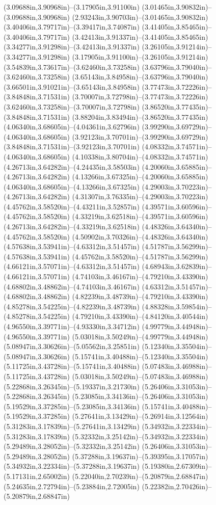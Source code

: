 (3.09688in,3.90968in)--(3.17905in,3.91100in) (3.01465in,3.90832in)--(3.09688in,3.90968in) (2.93243in,3.90703in)--(3.01465in,3.90832in) (3.40406in,3.79717in)--(3.39417in,3.74087in) (3.41405in,3.85465in)--(3.40406in,3.79717in) (3.42413in,3.91337in)--(3.41405in,3.85465in) (3.34277in,3.91298in)--(3.42413in,3.91337in) (3.26105in,3.91214in)--(3.34277in,3.91298in) (3.17905in,3.91100in)--(3.26105in,3.91214in) (3.54839in,3.73617in)--(3.62460in,3.73258in) (3.63796in,3.79040in)--(3.62460in,3.73258in) (3.65143in,3.84958in)--(3.63796in,3.79040in) (3.66501in,3.91021in)--(3.65143in,3.84958in) (3.77473in,3.72226in)--(3.84848in,3.71531in) (3.70007in,3.72798in)--(3.77473in,3.72226in) (3.62460in,3.73258in)--(3.70007in,3.72798in) (3.86520in,3.77435in)--(3.84848in,3.71531in) (3.88204in,3.83494in)--(3.86520in,3.77435in) (4.06340in,3.68605in)--(4.04361in,3.62796in) (3.99290in,3.69729in)--(4.06340in,3.68605in) (3.92123in,3.70701in)--(3.99290in,3.69729in) (3.84848in,3.71531in)--(3.92123in,3.70701in) (4.08332in,3.74571in)--(4.06340in,3.68605in) (4.10338in,3.80704in)--(4.08332in,3.74571in) (4.26713in,3.64282in)--(4.24435in,3.58503in) (4.20060in,3.65885in)--(4.26713in,3.64282in) (4.13266in,3.67325in)--(4.20060in,3.65885in) (4.06340in,3.68605in)--(4.13266in,3.67325in) (4.29003in,3.70223in)--(4.26713in,3.64282in) (4.31307in,3.76335in)--(4.29003in,3.70223in) (4.45762in,3.58520in)--(4.43211in,3.52857in) (4.39571in,3.60596in)--(4.45762in,3.58520in) (4.33219in,3.62518in)--(4.39571in,3.60596in) (4.26713in,3.64282in)--(4.33219in,3.62518in) (4.48326in,3.64340in)--(4.45762in,3.58520in) (4.50902in,3.70326in)--(4.48326in,3.64340in) (4.57638in,3.53941in)--(4.63312in,3.51457in) (4.51787in,3.56299in)--(4.57638in,3.53941in) (4.45762in,3.58520in)--(4.51787in,3.56299in) (4.66121in,3.57071in)--(4.63312in,3.51457in) (4.68943in,3.62839in)--(4.66121in,3.57071in) (4.74103in,3.46167in)--(4.79210in,3.43390in) (4.68802in,3.48862in)--(4.74103in,3.46167in) (4.63312in,3.51457in)--(4.68802in,3.48862in) (4.82239in,3.48739in)--(4.79210in,3.43390in) (4.85278in,3.54225in)--(4.82239in,3.48739in) (4.88328in,3.59854in)--(4.85278in,3.54225in) (4.79210in,3.43390in)--(4.84120in,3.40544in) (4.96550in,3.39771in)--(4.93330in,3.34712in) (4.99779in,3.44948in)--(4.96550in,3.39771in) (5.03018in,3.50249in)--(4.99779in,3.44948in) (5.08947in,3.30626in)--(5.05562in,3.25851in) (5.12340in,3.35504in)--(5.08947in,3.30626in) (5.15741in,3.40488in)--(5.12340in,3.35504in) (5.11725in,3.43728in)--(5.15741in,3.40488in) (5.07483in,3.46988in)--(5.11725in,3.43728in) (5.03018in,3.50249in)--(5.07483in,3.46988in) (5.22868in,3.26345in)--(5.19337in,3.21730in) (5.26406in,3.31053in)--(5.22868in,3.26345in) (5.23085in,3.34136in)--(5.26406in,3.31053in) (5.19529in,3.37285in)--(5.23085in,3.34136in) (5.15741in,3.40488in)--(5.19529in,3.37285in) (5.27641in,3.13429in)--(5.26914in,3.12564in) (5.31283in,3.17839in)--(5.27641in,3.13429in) (5.34932in,3.22334in)--(5.31283in,3.17839in) (5.32332in,3.25142in)--(5.34932in,3.22334in) (5.29489in,3.28052in)--(5.32332in,3.25142in) (5.26406in,3.31053in)--(5.29489in,3.28052in) (5.37288in,3.19637in)--(5.39395in,3.17057in) (5.34932in,3.22334in)--(5.37288in,3.19637in) (5.19380in,2.67309in)--(5.17131in,2.65002in) (5.22040in,2.70239in)--(5.20879in,2.68847in) (5.24635in,2.72794in)--(5.23884in,2.72005in) (5.22382in,2.70426in)--(5.20879in,2.68847in) 